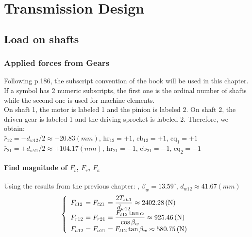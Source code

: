 \section{Transmission Design}
\subsection{Load on shafts}
\subsubsection{Applied forces from Gears}
Following p.186, the subscript convention of the book will be used in this chapter. If a symbol has 2 numeric subscripts, the first one is the ordinal number of shafts while the second one is used for machine elements.\\
On shaft 1, the motor is labeled 1 and the pinion is labeled 2. On shaft 2, the driven gear is labeled 1 and the driving sprocket is labeled 2. Therefore, we obtain:\\
$ \bar{r}_{12} = -d_{w12}/2 \approx -20.83\unit{(mm)}$, $ \text{hr}_{12} = +1 $, $ \text{cb}_{12} = +1 $, $ \text{cq}_1 = +1 $\\
$ \bar{r}_{21} = +d_{w21}/2 \approx +104.17\unit{(mm)}$, $ \text{hr}_{21} = -1 $, $ \text{cb}_{21} = -1$, $ \text{cq}_2 = -1$
\paragraph{Find magnitude of $ F_{t} $, $ F_r $, $ F_a $}
Using the results from the previous chapter: , $ \beta_w = 13.59^\circ $, $ d_{w12}\approx 41.67\unit{(mm)} $
\[
\left\{ 
\begin{array}{l@{{}={}}l@{{}={}}l}
F_{t12}& F_{t21}& \dfrac{2T_{sh1}}{d_{w12}}\approx 2402.28\unit{(N)}\\
F_{r12}& F_{r21}&  \dfrac{F_{t12}\tan\alpha}{\cos\beta_w}\approx 925.46 \unit{(N)}\\
F_{a12}& F_{a21}& F_{t12}\tan\beta_w\approx 580.75 \unit{(N)}\\ 
\end{array}
\right.
\]

